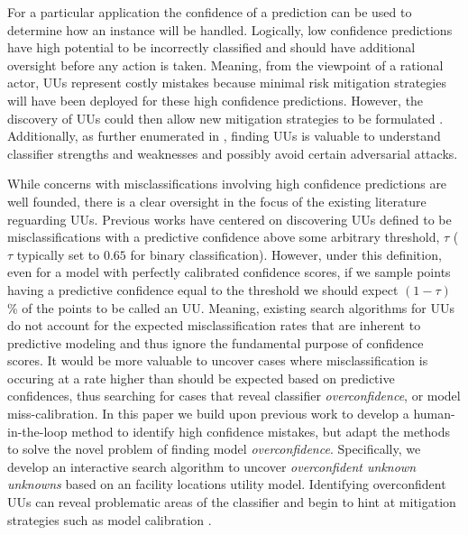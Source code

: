 \documentclass[letterpaper]{article} %
\begin{document}
For a particular application the confidence of a prediction can be used to determine how an instance will be handled.  Logically, low confidence predictions have high potential to be incorrectly classified and should have additional oversight before any action is taken.  Meaning, from the viewpoint of a rational actor, UUs represent costly mistakes because minimal risk mitigation strategies will have been deployed for these high confidence predictions.  However, the discovery of UUs could then allow new mitigation strategies to be formulated \citep{Nushi2016a}. Additionally, as further enumerated in \citet{Bansal2018}, finding UUs is valuable to understand classifier strengths and weaknesses and possibly avoid certain adversarial attacks.

While concerns with misclassifications involving high confidence predictions are well founded, there is a clear oversight in the focus of the existing literature reguarding UUs. Previous works have centered on discovering UUs defined to be misclassifications with a predictive confidence above some arbitrary threshold, $\tau$ ($\tau$ typically set to $0.65$ for binary classification). However, under this definition, even for a model with perfectly calibrated confidence scores, if we sample points having a predictive confidence equal to the threshold we should expect $(1-\tau)$\% of the points to be called an UU. Meaning, existing search algorithms for UUs do not account for the expected misclassification rates that are inherent to predictive modeling and thus ignore the fundamental purpose of confidence scores.  It would be more valuable to uncover cases where misclassification is occuring at a rate higher than should be expected based on predictive confidences, thus searching for cases that reveal classifier \textit{overconfidence}, or model miss-calibration. In this paper we build upon previous work to develop a human-in-the-loop method to identify high confidence mistakes, but adapt the methods to solve the novel problem of finding model \textit{overconfidence}. Specifically, we develop an interactive search algorithm to uncover \textit{overconfident unknown unknowns} based on an facility locations utility model. Identifying overconfident UUs can reveal problematic areas of the classifier and begin to hint at mitigation strategies such as model calibration \citep{bella2010calibration}.  
\end{document}
